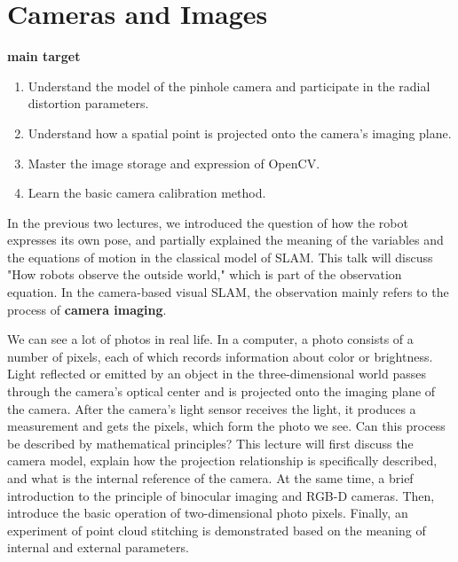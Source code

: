\chapter{Cameras and Images}
\label{cpt:5}

\begin{mdframed}  
	\textbf{main target}
	\begin{enumerate}
		\item Understand the model of the pinhole camera and participate in the radial distortion parameters.
		\item Understand how a spatial point is projected onto the camera's imaging plane.
		\item Master the image storage and expression of OpenCV.
		\item Learn the basic camera calibration method.
	\end{enumerate}
\end{mdframed}

In the previous two lectures, we introduced the question of how the robot expresses its own pose, and partially explained the meaning of the variables and the equations of motion in the classical model of SLAM. This talk will discuss "How robots observe the outside world," which is part of the observation equation. In the camera-based visual SLAM, the observation mainly refers to the process of \textbf{camera imaging}.

We can see a lot of photos in real life. In a computer, a photo consists of a number of pixels, each of which records information about color or brightness. Light reflected or emitted by an object in the three-dimensional world passes through the camera's optical center and is projected onto the imaging plane of the camera. After the camera's light sensor receives the light, it produces a measurement and gets the pixels, which form the photo we see. Can this process be described by mathematical principles? This lecture will first discuss the camera model, explain how the projection relationship is specifically described, and what is the internal reference of the camera. At the same time, a brief introduction to the principle of binocular imaging and RGB-D cameras. Then, introduce the basic operation of two-dimensional photo pixels. Finally, an experiment of point cloud stitching is demonstrated based on the meaning of internal and external parameters.
\newpage


\newpage










